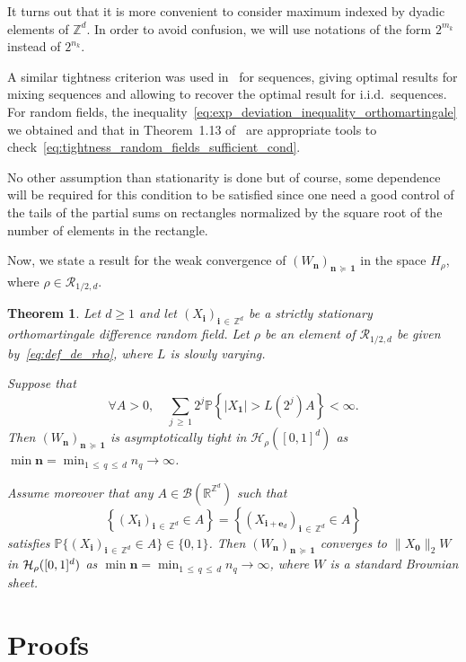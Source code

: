 \documentclass[10pt]{amsart}
\newtheorem{theo}{Theorem}[section]
\theoremstyle{definition}\newtheorem{defi}[theo]{Definition}\newtheorem{rema}[theo]{Remark}\newtheorem{exam}[theo]{Example}\newtheorem{exem}[theo]{Example}\newtheorem{nota}[theo]{Notation}
\newcommand{\Hca}{\mathcal{H}}
\newcommand{\Rca}{\mathcal{R}}
\newcommand{\clB}{\mathcal{B}}
\newcommand\R{\mathbb{R}}
\newcommand\PP{\mathbb{P}}
\newcommand\Z{\mathbb{Z}}
\newcommand\ens[1]{\{ #1\}}
\newcommand{\pr}[1]{(#1)}
\newcommand{\norm}[1]{\lVert #1\rVert}
\newcommand{\gr}[1]{\bm{#1}}
\newcommand{\gri}{\bm{i}}
\newcommand{\grn}{\bm{n}}
\newcommand{\smd}{\succcurlyeq }
\let\oldforall\forall
\renewcommand*{\forall}{\mathrel{\oldforall}}
\begin{document}
It turns out that it is more convenient to consider maximum indexed by dyadic elements of $\Z^d$. In order to avoid confusion, we will use notations of the form $2^{m_k}$ instead of $2^{n_k}$.


A similar tightness criterion was used in~\cite{MR3615086} for sequences, giving optimal results for mixing sequences and allowing to recover the optimal result for i.i.d.\ sequences. For random fields, the inequality~\eqref{eq:exp_deviation_inequality_orthomartingale} we obtained and that in Theorem~1.13 of~\cite{MR4046858} are appropriate tools to check~\eqref{eq:tightness_random_fields_sufficient_cond}.


No other assumption than stationarity is done but of course, some dependence will be required for this condition to be satisfied since one need a good control of the tails of the partial sums on rectangles normalized by the square root of the number of elements in the rectangle.

Now, we state a result for the weak convergence of $\pr{W_{\grn}}_{\grn\,\smd\,\gr{1}}$ in the space $H_\rho$, where $\rho\in\Rca_{1/2,d}$.

\begin{theo}\label{thm:WIP_Holder}
Let $d\geq 1$ and let $\pr{X_{\gri}}_{\gri\,\in\,\Z^d}$ be a strictly stationary orthomartingale difference random field. Let $\rho$ be an element of $\Rca_{1/2,d}$ be given by~\eqref{eq:def_de_rho}, where $L$ is slowly varying.

Suppose that
\begin{equation}\label{eq:cond_suff_WIP}
\forall A>0, \quad\sum_{j\,\geq\,1}2^j\PP\left\{\left|X_{\gr{1}}\right|>L\left(2^j\right)A\right\}<\infty.
\end{equation}
Then $\pr{W_{\grn}}_{\grn\,\smd\,\gr{1}}$ is asymptotically tight in $\Hca_\rho\pr{[0,1]^d}$ as $\min\grn=
\min_{1\,\leq\,q\,\leq\,d}n_q\to\infty$.

Assume moreover that any $A\in\clB\pr{\R^{\Z^d}}$ such that 
\[
\left\{\left(X_{\gri}\right)_{\gri\,\in\,\Z^d}\in A\right\}=\left\{\left(X_{\gri+\gr{e}_d}\right)_{\gri\,\in\,\Z^d}\in A\right\}
\]
satisfies $\PP\ens{\pr{X_{\gri}}_{\gri\,\in\,\Z^d}\in A}\in\ens{0,1}$. Then $\pr{W_{\grn}}_{\grn\,\smd\,\gr{1}}$ converges to $\norm{X_{\gr{0}}}_2 W$ in $\Hca_\rho\linebreak\pr{[0,1]^d}$ as $\min\grn=
\min_{1\,\leq\,q\,\leq\,d}n_q\to\infty$, where $W$ is a standard Brownian sheet.
\end{theo}


\section{Proofs}\label{sec:proofs}
\end{document}
